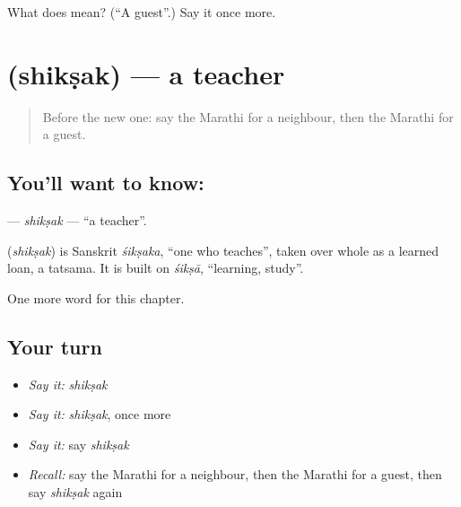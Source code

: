\begin{tcolorbox}[breakable,colback=teal!4,colframe=teal!35!black,title={Before you move on}]
What does  mean? (\textquotedblleft{}A guest\textquotedblright{}.) Say it once more.
\end{tcolorbox}
\section[\texorpdfstring{\mr{शिक्षक} (shikṣak)}{शिक्षक (shikṣak)}]{ (shikṣak) — a teacher}

\label{lesson:MR-C77-shiksak}



\begin{quote}
Before the new one: say the Marathi for a neighbour, then the Marathi for a guest.
\end{quote}

\subsection*{You'll want to know: }
\textbf{} — \emph{shikṣak} — \textquotedblleft{}a teacher\textquotedblright{}.

\begin{cousinweb}
\textbf{} (\emph{shikṣak}) is Sanskrit \emph{śikṣaka}, \textquotedblleft{}one who teaches\textquotedblright{}, taken over whole as a learned loan, a tatsama. It is built on \emph{śikṣā}, \textquotedblleft{}learning, study\textquotedblright{}.
\end{cousinweb}

\begin{grammarlens}[title={What you've built}]
One more word for this chapter.
\end{grammarlens}

\subsection*{Your turn}
\begin{itemize}
\raggedright
  \item \emph{Say it:} \emph{shikṣak}
  \item \emph{Say it:} \emph{shikṣak}, once more
  \item \emph{Say it:} say \emph{shikṣak}
  \item \emph{Recall:} say the Marathi for a neighbour, then the Marathi for a guest, then say \emph{shikṣak} again
\end{itemize}

